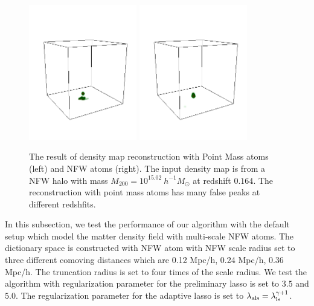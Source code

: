 \documentclass[twocolumn]{aastex62}
\begin{document}
\begin{figure}[!t]
\centering
\includegraphics[width=0.42\textwidth]{delta-1-7-pz-wn-PM-falsepeakproblem.png}
\includegraphics[width=0.42\textwidth]{delta-1-7-pz-wn-NFW-falsepeakproblem.png}
\caption{The result of density map reconstruction with  Point Mass atoms (left) and  NFW atoms (right). The input density 
        map is from a NFW halo with mass $M_{200}=10^{15.02} ~h^{-1}M_{\odot}$ at redshift $0.164$. The reconstruction 
        with point mass atoms has many false peaks at different redshfits.
        } \label{fig-lassoVsadaLasso}
\end{figure}


In this subsection, we test the performance of our algorithm with the default setup which model the matter density
field with multi-scale NFW atoms. The dictionary space is constructed with NFW atom with NFW scale radius set to
three different comoving distances which are 0.12 Mpc/h, 0.24 Mpc/h, 0.36 Mpc/h. The truncation radius is set to
four times of the scale radius.
We test the algorithm with regularization parameter for the preliminary lasso is set to $3.5$ and $5.0$. The 
regularization parameter for the adaptive lasso is set to $\lambda_{\rm{als}}=\lambda_{\rm{ls}}^{\gamma+1}$.
\end{document}
